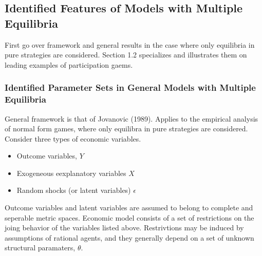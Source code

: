 \subsection{Identified Features of Models with Multiple Equilibria}
First go over framework and general results in the case where only equilibria in pure strategies are considered. Section 1.2 specializes and illustrates them on leading examples of participation gaems. 
 
\subsubsection{Identified Parameter Sets in General Models with Multiple Equilibria}

General framework is that of Jovanovic (1989). Applies to the empirical analysis of normal form games, where only equilibra in pure strategies are considered. Consider three types of economic variables. 
\begin{itemize}
	\item Outcome variables, $Y$
	\item Exogeneous eexplanatory variables $X$
	\item Random shocks (or latent variables) $\epsilon$
\end{itemize}
Outcome variables and latent variables are assumed to belong to complete and seperable metric spaces. Economic model consists of a set of restrictions on the joing behavior of the variables listed above. Restrivtions may be induced by assumptions of rational agents, and they generally depend on a set of unknown structural paramaters, $\theta$. 

